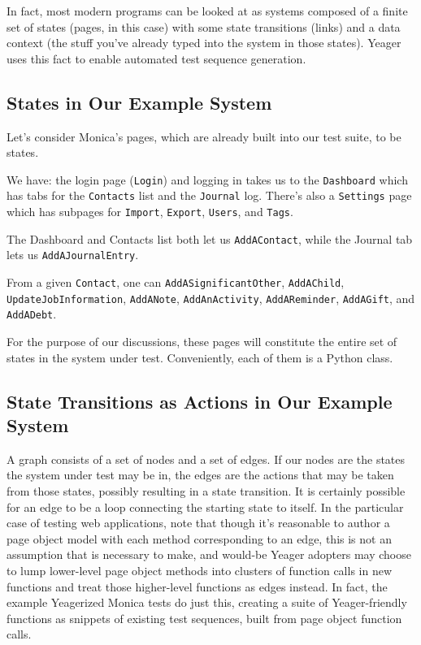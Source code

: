 In fact, most modern programs can be looked at as systems composed of a finite set of states (pages, in this case) with some state transitions (links) and a data context (the stuff you've already typed into the system in those states). Yeager uses this fact to enable automated test sequence generation.

\subsection{States in Our Example System}
Let's consider Monica's pages, which are already built into our test suite, to be states.

We have: the login page (\texttt{Login}) and logging in takes us to the \texttt{Dashboard} which has tabs for the \texttt{Contacts} list and the \texttt{Journal} log. There's also a \texttt{Settings} page which has subpages for \texttt{Import}, \texttt{Export}, \texttt{Users}, and \texttt{Tags}.

The Dashboard and Contacts list both let us \texttt{AddAContact}, while the Journal tab lets us \texttt{AddAJournalEntry}.

From a given \texttt{Contact}, one can \texttt{AddASignificantOther}, \texttt{AddAChild}, \\\texttt{UpdateJobInformation}, \texttt{AddANote}, \texttt{AddAnActivity}, \texttt{AddAReminder}, \texttt{AddAGift}, and \texttt{AddADebt}.

For the purpose of our discussions, these pages will constitute the entire set of states in the system under test. Conveniently, each of them is a Python class.

\subsection{State Transitions as Actions in Our Example System}
A graph consists of a set of nodes and a set of edges. If our nodes are the states the system under test may be in, the edges are the actions that may be taken from those states, possibly resulting in a state transition. It is certainly possible for an edge to be a loop connecting the starting state to itself. In the particular case of testing web applications, note that though it's reasonable to author a page object model with each method corresponding to an edge, this is not an assumption that is necessary to make, and would-be Yeager adopters may choose to lump lower-level page object methods into clusters of function calls in new functions and treat those higher-level functions as edges instead. In fact, the example Yeagerized Monica tests do just this, creating a suite of Yeager-friendly functions as snippets of existing test sequences, built from page object function calls.

